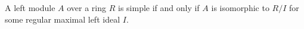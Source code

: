 A left module $A$ over a ring $R$ is simple if and only if $A$ is isomorphic to $R/I$ for some regular maximal left ideal $I$.

